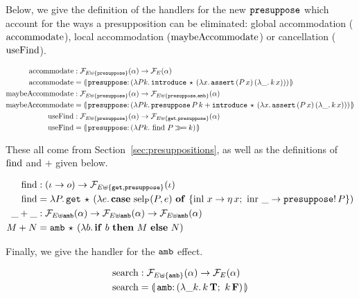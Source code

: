 Below, we give the definition of the handlers for the new $\mathtt{presuppose}$
which account for the ways a presupposition can be eliminated: global
accommodation ($\operatorname{accommodate}$), local accommodation ($\operatorname{maybeAccommodate}$)
or cancellation ($\operatorname{useFind}$).

\begin{align*}
  \accommodate &: \FF_{E \uplus \{\op{presuppose}\}}(\alpha) \to \FF_E(\alpha) \\
  \accommodate &= \banana{\onto{\op{presuppose}}{(\lam{P k}{
    \app{\op{introduce}}{\star}{(\lam{x}{\app{\op{assert}}{(\ap{P}{x})}{(\lam{\_}{\ap{k}{x}})}})}})}} \\
  \maybeAccommodate &: \FF_{E \uplus \{\op{presuppose}\}}(\alpha) \to
                      \FF_{E \uplus \{\op{presuppose},\op{amb}\}}(\alpha) \\
  \maybeAccommodate &= \banana{\onto{\op{presuppose}}{(\lam{P k}{
    \app{\op{presuppose}}{P}{k} +
    \app{\op{introduce}}{\star}{(\lam{x}{\app{\op{assert}}{(\ap{P}{x})}{(\lam{\_}{\ap{k}{x}})}})}})}} \\
  \useFind &: \FF_{E \uplus \{\op{presuppose}\}}(\alpha) \to \FF_{E \uplus \{\op{get}, \op{presuppose}\}}(\alpha) \\
  \useFind &= \banana{\onto{\op{presuppose}}{(\lam{P k}{\ap{\find}{P} \hsbind k})}}
\end{align*}

These all come from Section~\ref{sec:presuppositions}, as well as the
definitions of $\operatorname{find}$ and $+$ given below.

\begin{align*}
  \operatorname{find} &: (\iota \to o) \to \mathcal{F}_{E \uplus \{\mathtt{get}, \mathtt{presuppose}\}}(\iota) \\
  \operatorname{find} &= \lambda P.\, \mathtt{get}\,\star\,(\lambda e.\, \text{\textbf{case} $\operatorname{sel_P}(P, e)$ \textbf{of} $\{ \operatorname{inl}\,x \to \eta\,x;\ \operatorname{inr}\,\_ \to \mathtt{presuppose}!\,P \}$}) \\
  \_+\_ &: \mathcal{F}_{E \uplus \mathtt{amb}}(\alpha) \to \mathcal{F}_{E \uplus \mathtt{amb}}(\alpha) \to \mathcal{F}_{E \uplus \mathtt{amb}}(\alpha) \\
  M + N &= \mathtt{amb}\,\star\,(\lambda b.\, \text{\textbf{if} $b$ \textbf{then} $M$ \textbf{else} $N$})
\end{align*}

Finally, we give the handler for the $\mathtt{amb}$ effect.

\begin{align*}
  \search &: \FF_{E \uplus \{\op{amb}\}}(\alpha) \to \FF_E(\alpha) \\
  \search &= \banana{\onto{\op{amb}}{(\lam{\_ k}{\ap{k}{\true};\ \ap{k}{\false}})}}
\end{align*}

